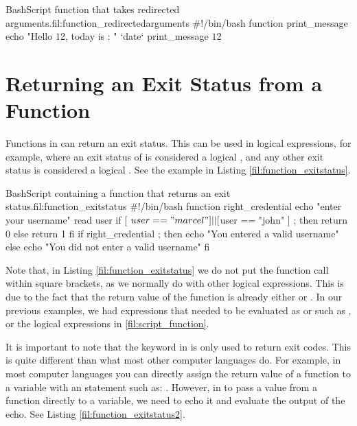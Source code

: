  \begin{source_code_float}{Bash}{Script function that takes redirected arguments.}{fil:function_redirectedarguments}
#!/bin/bash
function print_message {
    echo "Hello $1 $2,  today is : " `date`
}
print_message $1 $2 
\end{source_code_float}


\section{Returning an Exit Status from a Function}
Functions in  can return an exit status. This can be used in logical expressions, for example, where an exit status of  is considered a logical , and any other exit status is considered a logical . See the example in Listing \ref{fil:function_exitstatus}.

 \begin{source_code_float}{Bash}{Script containing a function that returns an exit status.}{fil:function_exitstatus}
#!/bin/bash
function right_credential {
    echo "enter your username" 
    read user
    if [ $user == "marcel" ] || [ $user == "john" ] ; then
        return 0
    else
        return 1
    fi
}
if right_credential ; then
    echo "You entered a valid username"
else
    echo "You did not enter a valid username"
fi
\end{source_code_float}
Note that, in Listing \ref{fil:function_exitstatus} we do not put the  function call within square brackets, as we normally do with other logical expressions. This is due to the fact that the return value of the function is already either  or . In our previous examples, we had expressions that needed to be evaluated as  or  such as , or the logical expressions in \ref{fil:script_function}.

It is important to note that the  keyword in  is only used to return exit codes. This is quite different than what most other computer languages do. For example, in most computer languages you can directly assign the return value of a function to a variable with an statement such as: . However, in  to pass a value from a function directly to a variable, we need to echo it and evaluate the output of the echo. See Listing \ref{fil:function_exitstatus2}.

